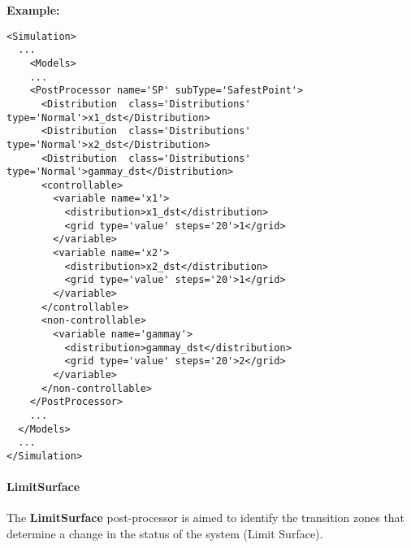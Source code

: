 \textbf{Example:}
\begin{lstlisting}[style=XML,morekeywords={name,subType,class,type,steps}]
<Simulation>
  ...
    <Models>
    ...
    <PostProcessor name='SP' subType='SafestPoint'>
      <Distribution  class='Distributions'  type='Normal'>x1_dst</Distribution>
      <Distribution  class='Distributions'  type='Normal'>x2_dst</Distribution>
      <Distribution  class='Distributions'  type='Normal'>gammay_dst</Distribution>
      <controllable>
        <variable name='x1'>
          <distribution>x1_dst</distribution>
          <grid type='value' steps='20'>1</grid>
        </variable>
        <variable name='x2'>
          <distribution>x2_dst</distribution>
          <grid type='value' steps='20'>1</grid>
        </variable>
      </controllable>
      <non-controllable>
        <variable name='gammay'>
          <distribution>gammay_dst</distribution>
          <grid type='value' steps='20'>2</grid>
        </variable>
      </non-controllable>
    </PostProcessor>
    ...
  </Models>
  ...
</Simulation>
\end{lstlisting}
\paragraph{LimitSurface}
\label{LimitSurface}
The \textbf{LimitSurface} post-processor is aimed to identify the transition
zones that determine a change in the status of the system (Limit Surface).


